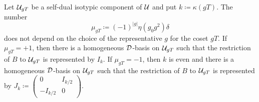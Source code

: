 \begin{lemma}\label{lemma:self-dual-components}
    Let $\mathcal U_{gT}$ be a self-dual isotypic component of $\mathcal U$ and put $k \coloneqq \kappa(gT)$. 
    The number 
    \begin{equation}
        \mu_{gT} \coloneqq (-1)^{|g|} \eta(g_0 g^2)\delta
    \end{equation}
    does not depend on the choice of the representative $g$ for the coset $gT$. 
    If $\mu_{gT} = +1$, then there is a homogeneous $\mathcal{D}$-basis on $\mathcal U_{gT}$ such that the restriction of $B$ to $\mathcal U_{gT}$ is represented by $I_k$. 
    If $\mu_{gT} = -1$, then $k$ is even and there is a homogeneous $\mathcal{D}$-basis on $\mathcal U_{gT}$ such that the restriction of $B$ to $\mathcal U_{gT}$ is represented by $J_k \coloneqq 
    \begin{pmatrix}
        0 & I_{k/2}\\
        -I_{k/2} & 0
    \end{pmatrix}$. 
\end{lemma}

